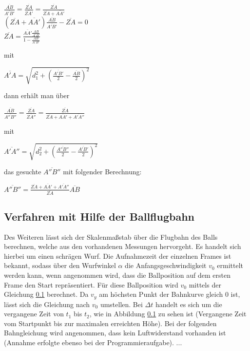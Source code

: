 \documentclass{ezb}
\begin{document}
\begin{center}
$\frac{\overline{AB}}{\overline{A'B'}} = \frac{\overline{ZA}}{\overline{ZA'}} = \frac{\overline{ZA}}{\overline{ZA}+\overline{AA'}}$\\
$(\overline{ZA}+\overline{AA'})\frac{\overline{AB}}{\overline{A'B'}}-\overline{ZA}=0$\\
$\overline{ZA}=\frac{\overline{AA'}\frac{AB}{A'B'}}{1-\frac{AB}{A'B'}}$
\end{center}
mit
\begin{center}
$\overline{A'A} = \sqrt{d_{1}^{2}+(\frac{\overline{A'B'}}{2}-\frac{\overline{AB}}{{2}})^{2}}$\\
\end{center}
dann erhält man über
\begin{center}
$\frac{\overline{AB}}{\overline{A''B''}} = \frac{\overline{ZA}}{\overline{ZA''}} = \frac{\overline{ZA}}{\overline{ZA}+\overline{AA'}+\overline{A'A''}} $\\
\end{center}
mit
\begin{center}
$\overline{A'A''} = \sqrt{d_{2}^{2}+(\frac{\overline{A''B''}}{2}-\frac{\overline{A'B'}}{{2}})^{2}}$\\
\end{center}
das gesuchte $\overline{A''B''}$ mit folgender Berechnung:\\
\begin{center}
$\overline{A''B''} = \frac{\overline{ZA}+\overline{AA'}+\overline{A'A''}}{\overline{ZA}}\overline{AB}$
\end{center}
\subsection{Verfahren mit Hilfe der Ballflugbahn}
Des Weiteren lässt sich der Skalenmaßstab über die Flugbahn des Balls berechnen, welche aus den vorhandenen Messungen hervorgeht. Es handelt sich hierbei um einen schrägen Wurf. Die Aufnahmezeit der einzelnen Frames ist bekannt, sodass über den Wurfwinkel $\alpha$ die Anfangsgeschwindigkeit $v_0$ ermittelt werden kann, wenn angenommen wird, dass die Ballposition auf dem ersten Frame den Start repräsentiert. Für diese Ballposition wird $v_0$ mittels der Gleichung \ref{} berechnet. 
Da $v_y$ am höchsten Punkt der Bahnkurve gleich 0 ist, lässt sich die Gleichung nach $v_0$ umstellen. Bei $\Delta t$ handelt es sich um die vergangene Zeit von $t_1$ bis $t_2$, wie in Abbildung \ref{} zu sehen ist (Vergangene Zeit vom Startpunkt bis zur maximalen erreichten Höhe).
Bei der folgenden Bahngleichung wird angenommen, dass kein Luftwiderstand vorhanden ist (Annahme erfolgte ebenso bei der Programmieraufgabe). ...





\end{document}
